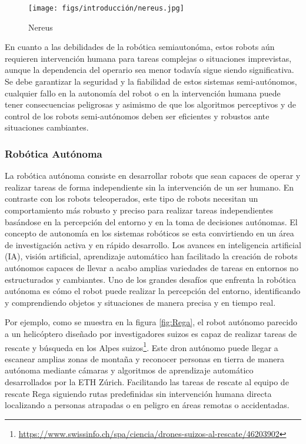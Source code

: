 \begin{figure} [H]
  \begin{center}
    \texttt{[image: figs/introducción/nereus.jpg]}
  \end{center}
  \caption{Nereus}
  \label{fig:Nereus}
  \vspace{-1.5em}
\end{figure}



En cuanto a las debilidades de la robótica semiautonóma, estos robots 
aún requieren intervención humana para tareas complejas o situaciones imprevistas, aunque la dependencia del operario sea menor todavía sigue siendo significativa. 
Se debe garantizar la seguridad y la fiabilidad de estos sistemas semi-autónomos, cualquier fallo en la autonomía del robot 
o en la intervención humana puede tener consecuencias peligrosas y asimismo de que los algoritmos perceptivos y de control de los robots semi-autónomos deben ser eficientes y 
robustos ante situaciones cambiantes.

\subsubsection{Robótica Autónoma}
\label{sec:subseccion}

La robótica autónoma consiste en desarrollar robots que sean capaces de operar y realizar tareas de forma independiente sin la intervención de un ser humano. En contraste con los 
robots teleoperados, este tipo de robots necesitan un comportamiento más robusto y preciso para realizar tareas independientes basándose en la percepción del entorno 
y en la toma de decisiones autónomas.
El concepto de autonomía en los sistemas robóticos se esta convirtiendo en un área de investigación activa y en rápido desarrollo. Los avances en inteligencia artificial (IA), visión 
artificial, aprendizaje automático han facilitado la creación de robots autónomos capaces de llevar a acabo amplias variedades de tareas en entornos no estructurados y cambiantes. 
Uno de los grandes desafíos que enfrenta la robótica autónoma es cómo el robot puede realizar la percepción del entorno, identificando y comprendiendo objetos y situaciones de manera
precisa y en tiempo real. 

Por ejemplo, como se muestra en la figura \ref{fig:Rega}, el robot autónomo parecido a un helicóptero diseñado por investigadores suizos es capaz de realizar tareas de 
rescate y búsqueda en los Alpes suizos\footnote{\url{https://www.swissinfo.ch/spa/ciencia/drones-suizos-al-rescate/46203902}}. Este dron autónomo puede llegar a escanear amplias zonas de montaña y reconocer personas en tierra de manera autónoma mediante
cámaras y algoritmos de aprendizaje automático desarrollados por la ETH Zúrich. Facilitando las tareas de rescate al equipo de rescate Rega siguiendo rutas
predefinidas sin intervención humana directa localizando a personas atrapadas o en peligro en áreas remotas o accidentadas.

